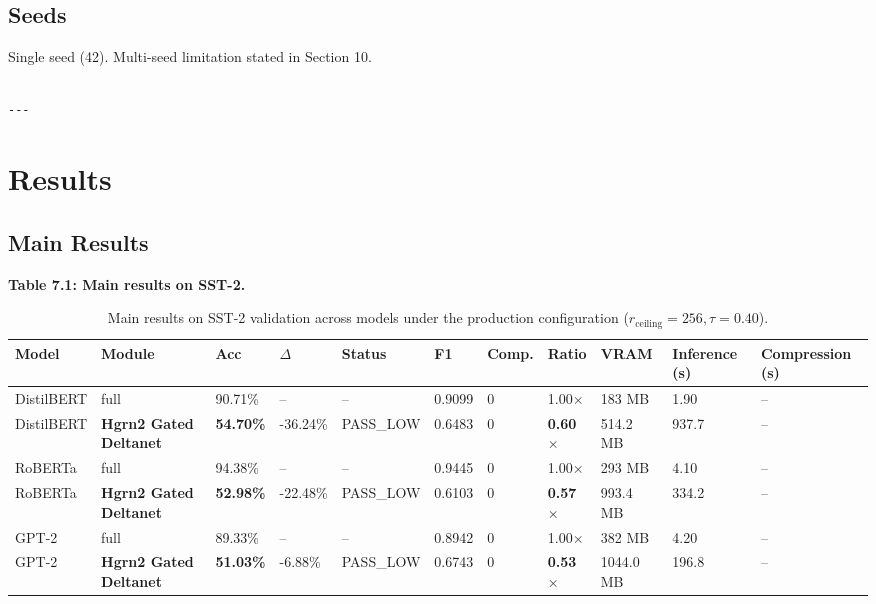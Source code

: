 \subsection{Seeds}

Single seed (42). Multi-seed limitation stated in Section 10.
\begin{lstlisting}

---
\end{lstlisting}

\section{Results}

\subsection{Main Results}

\textbf{Table 7.1: Main results on SST-2.}

\begin{table}[t]
\centering
\small
\begin{tabular}{lllllllllll}
\toprule
\textbf{Model} & \textbf{Module} & \textbf{Acc} & \textbf{$\Delta$} & \textbf{Status} & \textbf{F1} & \textbf{Comp.} & \textbf{Ratio} & \textbf{VRAM} & \textbf{Inference (s)} & \textbf{Compression (s)} \\
\midrule
DistilBERT & full & 90.71\% & -- & -- & 0.9099 & 0 & 1.00$\times$ & 183 MB & 1.90 & -- \\
DistilBERT & \textbf{Hgrn2 Gated Deltanet} & \textbf{54.70\%} & -36.24\% & PASS\_LOW & 0.6483 & 0 & \textbf{0.60$\times$} & 514.2 MB & 937.7 & -- \\
RoBERTa & full & 94.38\% & -- & -- & 0.9445 & 0 & 1.00$\times$ & 293 MB & 4.10 & -- \\
RoBERTa & \textbf{Hgrn2 Gated Deltanet} & \textbf{52.98\%} & -22.48\% & PASS\_LOW & 0.6103 & 0 & \textbf{0.57$\times$} & 993.4 MB & 334.2 & -- \\
GPT-2 & full & 89.33\% & -- & -- & 0.8942 & 0 & 1.00$\times$ & 382 MB & 4.20 & -- \\
GPT-2 & \textbf{Hgrn2 Gated Deltanet} & \textbf{51.03\%} & -6.88\% & PASS\_LOW & 0.6743 & 0 & \textbf{0.53$\times$} & 1044.0 MB & 196.8 & -- \\
\bottomrule
\end{tabular}
\caption{Main results on SST-2 validation across models under the production configuration ($r_{\mathrm{ceiling}}=256, \tau=0.40$).}
\label{tab:main_sst2}
\end{table}

